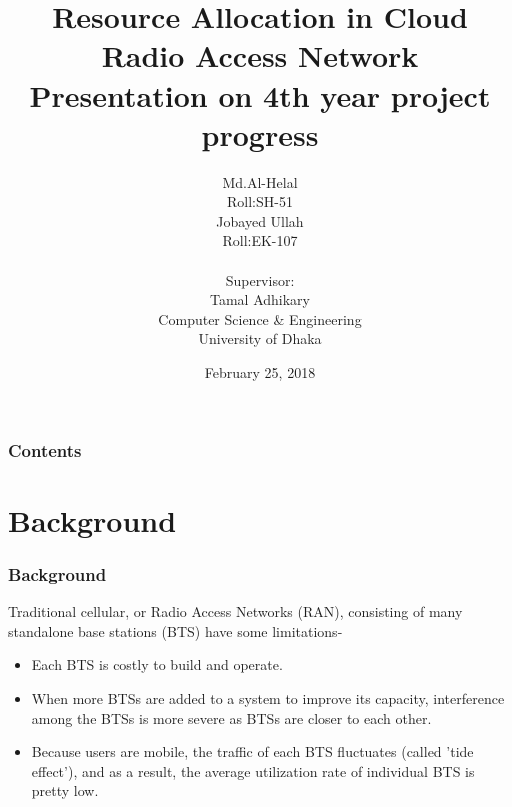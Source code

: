 \documentclass[usenames,dvipsnames]{beamer}
\begin{document}
  \title{Resource  Allocation in Cloud Radio Access Network\\Presentation on 4th year project progress}
  \author[Md.Al-Helal \& Jobayed Ullah]{
  \parbox{2.5cm}{
\centering Md.Al-Helal\\Roll:SH-51}\hspace{3cm}
\parbox{2.5cm}{
{\centering Jobayed Ullah\\Roll:EK-107}}
\centering \vspace{1cm}\\Supervisor:\\Tamal Adhikary\\\scriptsize{Computer Science \& Engineering\\University of Dhaka}
}

\vspace{1cm}
\date{February 25, 2018}
\begin{frame}
  \maketitle
\end{frame}

\begin{frame}
\frametitle{Contents}
\tableofcontents
\end{frame}
\section{Background}

\begin{frame}
  \frametitle{Background}
  Traditional cellular, or Radio Access Networks (RAN), consisting of many standalone base stations (BTS) have some limitations-
  \begin{itemize}
    \item Each BTS is costly to build and operate.
    \item When more BTSs are added to a system to improve its capacity, interference among the BTSs is more severe as BTSs are closer to each other.
    \item Because users are mobile, the traffic of each BTS fluctuates (called 'tide effect'), and as a result, the average utilization rate of individual BTS is pretty low.
  \end{itemize}
\end{frame}
\end{document}
